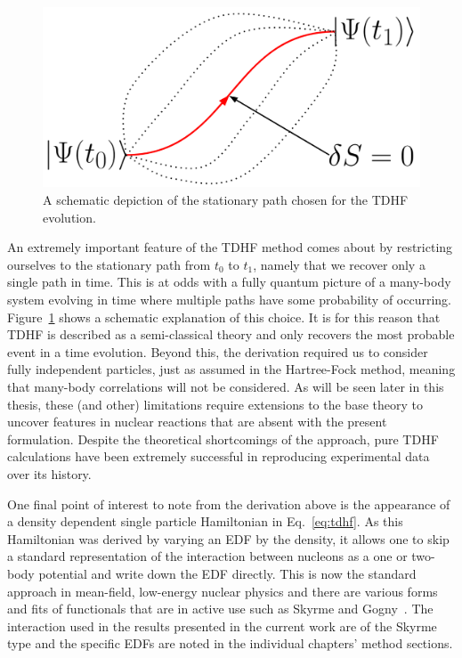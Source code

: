 \begin{figure}[t]
	\includegraphics[width=\textwidth]{../Figures/intro_figs/paths.png}
	\caption{A schematic depiction of the stationary path chosen for the TDHF evolution.}
	\label{fig:paths}
\end{figure}

An extremely important feature of the TDHF method comes about by restricting ourselves to the stationary path from $t_0$ to $t_1$, namely that we recover only a single path in time.
This is at odds with a fully quantum picture of a many-body system evolving in time where multiple paths have some probability of occurring.
Figure~\ref{fig:paths} shows a schematic explanation of this choice.
It is for this reason that TDHF is described as a semi-classical theory and only recovers the most probable event in a time evolution.
Beyond this, the derivation required us to consider fully independent particles, just as assumed in the Hartree-Fock method, meaning that many-body correlations will not be considered.
As will be seen later in this thesis, these (and other) limitations require extensions to the base theory to uncover features in nuclear reactions that are absent with the present formulation.
Despite the theoretical shortcomings of the approach, pure TDHF calculations have been extremely successful in reproducing experimental data over its history.

One final point of interest to note from the derivation above is the appearance of a density dependent single particle Hamiltonian in Eq.~\ref{eq:tdhf}.
As this Hamiltonian was derived by varying an EDF by the density, it allows one to skip a standard representation of the interaction between nucleons as a one or two-body potential and write down the EDF directly.
This is now the standard approach in mean-field, low-energy nuclear physics and there are various forms and fits of functionals that are in active use such as Skyrme and Gogny~\citep{skyrme1956,decharge1980}.
The interaction used in the results presented in the current work are of the Skyrme type and the specific EDFs are noted in the individual chapters' method sections.

